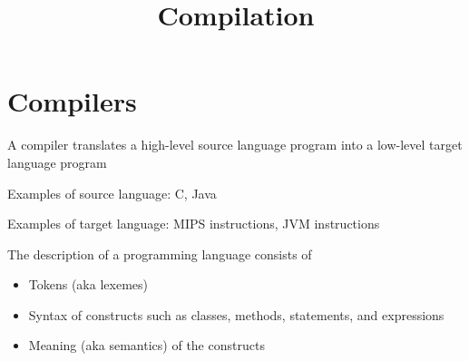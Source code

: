\documentclass[8pt,a4paper,compress]{beamer}
\title{Compilation}
\date{}
\begin{document}
\begin{frame}
\vfill
\titlepage
\end{frame}

\section{Compilers}
\begin{frame}[fragile]
\pause

A compiler translates a high-level source language program into a low-level target language program

\begin{center}
\end{center}

\pause\bigskip

Examples of source language: C, Java

\pause\bigskip

Examples of target language: MIPS instructions, JVM instructions
\end{frame}

\begin{frame}[fragile]
\pause

The description of a programming language consists of
\begin{itemize}
\pause
\item Tokens (aka lexemes)

\pause
\item Syntax of constructs such as classes, methods, statements, and expressions

\pause
\item Meaning (aka semantics) of the constructs
\end{itemize}
\end{frame}
\end{document}
